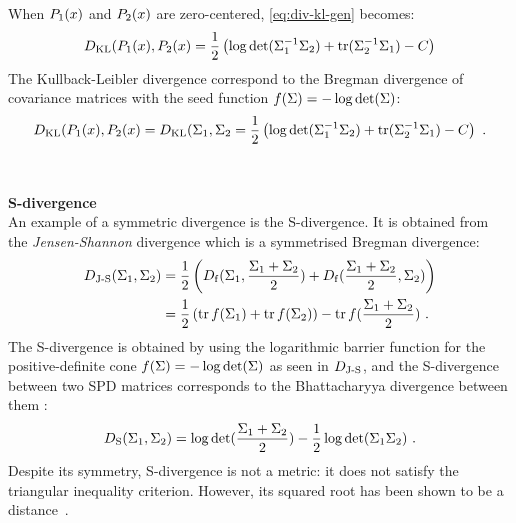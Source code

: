 When $P_1(\x)$ and $P_2(\x)$ are zero-centered, \eqref{eq:div-kl-gen} becomes:  
\begin{equation}
\divB{KL}(P_1(\x), P_2(\x) = \frac{1}{2} \left( \log \det (\P_1^{-1} \P_2) + \tr(\P_2^{-1} \P_1) - \dc \right) 
\label{eq:div-kl-proba}
\end{equation}
The Kullback-Leibler divergence correspond to the Bregman divergence of covariance matrices with the seed function $f(\P) = -\log \det (\P) $:
\begin{equation}
\divB{KL}(P_1(\x), P_2(\x) = \divB{KL}(\P_1, \P_2 = \frac{1}{2} \left( \log \det(\P_1^{-1} \P_2) + \tr(\P_2^{-1} \P_1) - \dc \right) \ .
\label{eq:div-kl}
\end{equation}
\\ \\ \textbf{S-divergence} \\
An example of a symmetric divergence is the S-divergence. 
It is obtained from the \emph{Jensen-Shannon} divergence which is a symmetrised Bregman divergence:
\begin{equation}
\begin{split}
\divB{J-S}(\P_1, \P_2) & = \frac{1}{2} \left( \divB{f}(\P_1,\frac{\P_1+\P_2}{2}) + \divB{f}(\frac{\P_1+\P_2}{2},\P_2) \right) 
\\
 & = \frac{1}{2} \left( \tr f(\P_1) + \tr f(\P_2) \right) - \tr f(\frac{\P_1+\P_2}{2}) \ .
\end{split} 
\label{eq:div-js}
\end{equation}
The S-divergence is obtained by using the logarithmic barrier function for the positive-definite cone $f(\P)=-\log \det(\P)$ as seen in $\divB{J-S}$, and the S-divergence between two SPD matrices corresponds to the Bhattacharyya divergence between them \cite{sra_positive_2016}:
\begin{equation}
\divB{S}(\P_1,\P_2) = \log \det(\frac{\P_1+\P_2}{2}) - \frac{1}{2}\log \det(\P_1 \P_2) \ .
\label{eq:div-s}
\end{equation}  
Despite its symmetry, S-divergence is not a metric: it does not satisfy the triangular inequality criterion. 
However, its squared root has been shown to be a distance~\cite{sra_positive_2016}.

